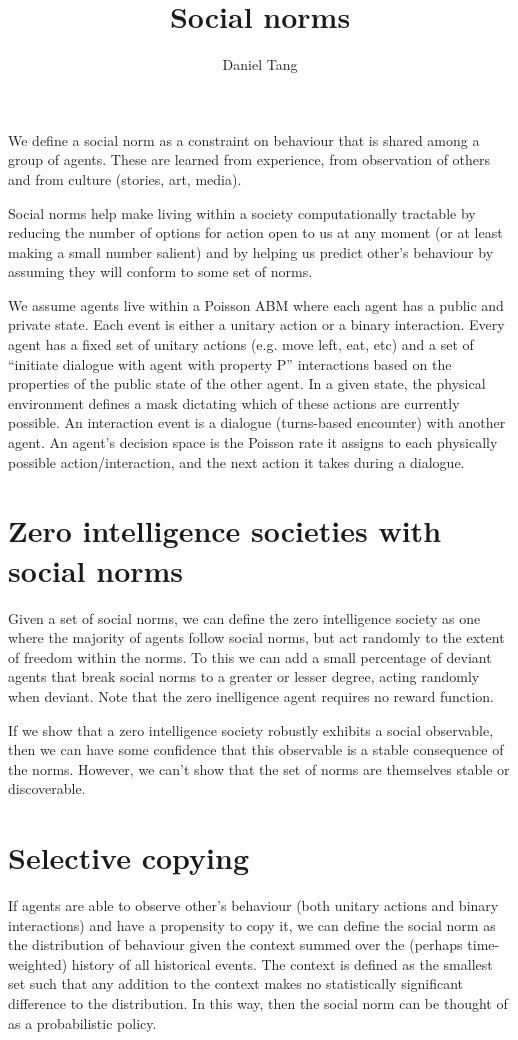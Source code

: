 \documentclass[a4paper]{article}
\title{Social norms}
\author{Daniel Tang}
\begin{document}
\maketitle

We define a social norm as a constraint on behaviour that is shared among a group of agents. These are learned from experience, from observation of others and from culture (stories, art, media).

Social norms help make living within a society computationally tractable by reducing the number of options for action open to us at any moment (or at least making a small number salient) and by helping us predict other's behaviour by assuming they will conform to some set of norms.

We assume agents live within a Poisson ABM where each agent has a public and private state. Each event is either a unitary action or a binary interaction. Every agent has a fixed set of unitary actions (e.g. move left, eat, etc) and a set of ``initiate dialogue with agent with property P'' interactions based on the properties of the public state of the other agent. In a given state, the physical environment defines a mask dictating which of these actions are currently possible. An interaction event is a dialogue (turns-based encounter) with another agent. An agent's decision space is the Poisson rate it assigns to each physically possible action/interaction, and the next action it takes during a dialogue.

\section{Zero intelligence societies with social norms}

Given a set of social norms, we can define the zero intelligence society as one where the majority of agents follow social norms, but act randomly to the extent of freedom within the norms. To this we can add a small percentage of deviant agents that break social norms to a greater or lesser degree, acting randomly when deviant. Note that the zero inelligence agent requires no reward function.

If we show that a zero intelligence society robustly exhibits a social observable, then we can have some confidence that this observable is a stable consequence of the norms. However, we can't show that the set of norms are themselves stable or discoverable.

\section{Selective copying}
If agents are able to observe other's behaviour (both unitary actions and binary interactions) and have a propensity to copy it, we can define the social norm as the distribution of behaviour given the context summed over the (perhaps time-weighted) history of all historical events. The context is defined as the smallest set such that any addition to the context makes no statistically significant difference to the distribution. In this way, then the social norm can be thought of as a probabilistic policy.
\end{document}

